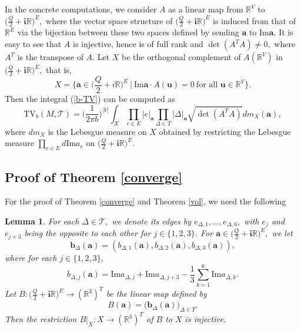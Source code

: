 \documentclass[11pt]{article}
\newtheorem{lemma}[theorem]{Lemma}
\theoremstyle{remark}
\theoremstyle{remark}
\numberwithin{equation}{section}
\begin{document}
In the concrete computations, 
we  consider $A$ as a linear map from $\mathbb R^V$ to $\big(\frac{Q}{2}+\mathbf i\mathbb R\big)^E,$ where the vector space structure of 
$\big(\frac{Q}{2}+\mathbf i\mathbb R\big)^E$ is induced from that of $\mathbb R^E$ via the bijection between these two spaces defined by sending $\boldsymbol a$ to $\mathrm{Im}\boldsymbol a.$ 
It is easy to see that $A$ is injective, 
hence is of full rank and $\det(A^TA)\neq 0,$ where $A^T$ is the transpose of $A.$
Let $X$ be the orthogonal complement of $A(\mathbb R^V)$ in $\big(\frac{Q}{2}+\mathbf i\mathbb R\big)^E,$ that is,
$$X=\Bigg\{ \boldsymbol a\in  \bigg(\frac{Q}{2}+i\mathbb R\bigg)^E \ \Bigg|\  \mathrm{Im}\boldsymbol a\cdot A(\boldsymbol u) = 0\ \text{for all }\boldsymbol u\in \mathbb R^V\Bigg\}.$$ Then the integral (\ref{b-TV}) can be computed  as 
\begin{equation}\label{b-TV2}
   \mathrm{TV}_b(M,\mathcal T)= \Big(\frac{1}{2\pi b}\Big)^{|V|} \int _ X \prod_{e\in E} |e|_{\boldsymbol{a}}\prod_{\Delta\in T}|\Delta|_{\boldsymbol a}\sqrt{\det(A^T A)}dm_X(\boldsymbol a),
\end{equation}
where $dm_X$ is the Lebesgue measure on $X$ obtained by restricting the Lebesgue measure $\prod_{e\in E}d\mathrm{Im}a_e$ on $\big(\frac{Q}{2}+\mathbf i\mathbb R\big)^E.$ 



\subsection{Proof of Theorem \ref{converge}}

 For the proof of Theorem \ref{converge} and Theorem \ref{vol}, we need the following 


\begin{lemma}\label{inj} 
For each $\Delta\in \mathcal T, $ we denote its edges by $e_{\Delta,1},\dots,e_{\Delta,6},$ with  $e_j$ and $e_{j+3}$ being the opposite to each other for $j\in\{1,2,3\}$.  For $\boldsymbol a \in \big(\frac{Q}{2}+\mathbf i \mathbb R\big)^E,$ we let 
$$\boldsymbol b_\Delta(\boldsymbol a)=(b_{\Delta,1}(\boldsymbol a),b_{\Delta,2}(\boldsymbol a),b_{\Delta,3}(\boldsymbol a)),$$
where  for each $j\in \{1,2,3\},$
$$b_{\Delta,j}(\boldsymbol a)=\mathrm{Im}a_{\Delta,j}+\mathrm{Im}a_{\Delta,j+3}-\frac{1}{3}\sum_{k=1}^6\mathrm{Im}a_{\Delta,k}.$$ 
Let $B: \big(\frac{Q}{2}+\mathbf i\mathbb R\big)^E \to (\mathbb R^3)^T$ be the linear map defined by
$$B(\boldsymbol a)= \big(\boldsymbol b_{\Delta}(\boldsymbol a)\big)_{\Delta\in T}.$$
Then the restriction 
$B|_X: X \to (\mathbb R^3)^T$
of $B$ to $X$ is injective. 
\end{lemma}
\end{document}
